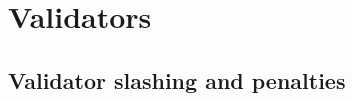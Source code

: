 \documentclass[UTF8]{article}
\begin{document}
%
%
%
%
%
%
%
\section{Validators}
\label{sec:validators}
\subsection{Validator slashing and penalties}
\label{slashing}
\end{document}
